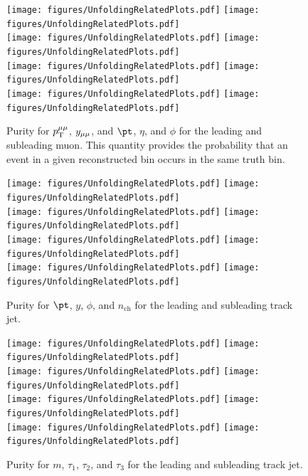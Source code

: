 \begin{figure}[h!]
  \centering
  \texttt{[image: figures/UnfoldingRelatedPlots.pdf]}
  \texttt{[image: figures/UnfoldingRelatedPlots.pdf]} \\
  \texttt{[image: figures/UnfoldingRelatedPlots.pdf]}
  \texttt{[image: figures/UnfoldingRelatedPlots.pdf]} \\
  \texttt{[image: figures/UnfoldingRelatedPlots.pdf]}
  \texttt{[image: figures/UnfoldingRelatedPlots.pdf]} \\
  \texttt{[image: figures/UnfoldingRelatedPlots.pdf]}
  \texttt{[image: figures/UnfoldingRelatedPlots.pdf]}
  \caption{Purity for $p_\mathrm{T}^{\mu\mu}$, $y_{\mu\mu}$, and $\pt$, $\eta$, and $\phi$ for the leading and subleading muon. This quantity provides the probability that an event in a given reconstructed bin occurs in the same truth bin.}
  \label{fig:binPurDilep}
\end{figure}

\begin{figure}[h!]
  \centering
  \texttt{[image: figures/UnfoldingRelatedPlots.pdf]}
  \texttt{[image: figures/UnfoldingRelatedPlots.pdf]} \\
  \texttt{[image: figures/UnfoldingRelatedPlots.pdf]}
  \texttt{[image: figures/UnfoldingRelatedPlots.pdf]} \\
  \texttt{[image: figures/UnfoldingRelatedPlots.pdf]}
  \texttt{[image: figures/UnfoldingRelatedPlots.pdf]} \\
  \texttt{[image: figures/UnfoldingRelatedPlots.pdf]}
  \texttt{[image: figures/UnfoldingRelatedPlots.pdf]}
  \caption{Purity for $\pt$, $y$, $\phi$, and $n_{\text{ch}}$ for the leading and subleading track jet.}
  \label{fig:binPurTJ1}
\end{figure}

\begin{figure}[h!]
  \centering
  \texttt{[image: figures/UnfoldingRelatedPlots.pdf]}
  \texttt{[image: figures/UnfoldingRelatedPlots.pdf]} \\
  \texttt{[image: figures/UnfoldingRelatedPlots.pdf]}
  \texttt{[image: figures/UnfoldingRelatedPlots.pdf]} \\
  \texttt{[image: figures/UnfoldingRelatedPlots.pdf]}
  \texttt{[image: figures/UnfoldingRelatedPlots.pdf]} \\
  \texttt{[image: figures/UnfoldingRelatedPlots.pdf]}
  \texttt{[image: figures/UnfoldingRelatedPlots.pdf]}
  \caption{Purity for $m$, $\tau_1$, $\tau_2$, and $\tau_3$ for the leading and subleading track jet.}
  \label{fig:binPurTJ2}
\end{figure}


